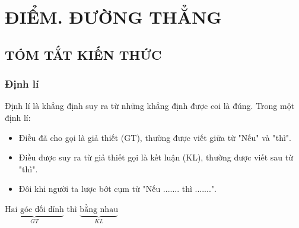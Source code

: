 \section{ĐIỂM. ĐƯỜNG THẲNG}
\subsection{TÓM TẮT KIẾN THỨC}
\begin{tomtat}
	\subsubsection{Định lí}
Định lí là khẳng định suy ra từ những khẳng định được coi là đúng. Trong một định lí:
\begin{itemize}
\item Điều đã cho gọi là giả thiết (GT), thường được viết giữa từ "Nếu" và "thì".
\item Điều được suy ra từ giả thiết gọi là kết luận (KL), thường được viết sau từ "thì".
\item Đôi khi người ta lược bớt cụm từ "Nếu ....... thì .......".
\end{itemize}
\begin{vd}
$\underbrace {\text{Hai góc đối đỉnh}}_{GT}$ thì $\underbrace{\text{bằng nhau}}_{KL}$\end{vd}
\end{tomtat}

